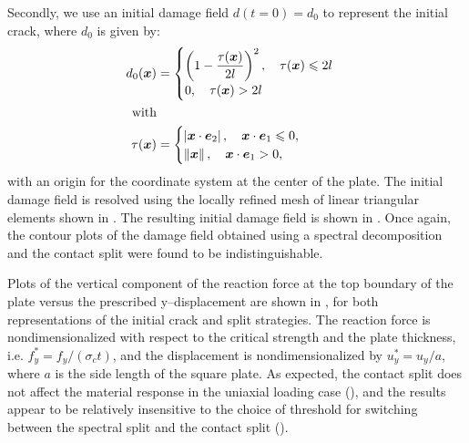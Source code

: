 

Secondly, we use an initial damage field $d(t = 0) = d_0$ to represent the initial crack, where $d_0$ is given by:
\begin{align}
  d_0(\boldsymbol{x})  & =
  \begin{cases}
    \left( 1-\dfrac{\tau(\boldsymbol{x})}{2l} \right)^2, \quad \tau(\boldsymbol{x}) \leqslant 2l \\
    0, \quad  \tau(\boldsymbol{x}) > 2l
  \end{cases} \label{eq: mode1 initial damage} \\
  \mbox{with}  &                                             \\
  \tau(\boldsymbol{x}) & =
  \begin{cases}
    \left\vert \boldsymbol{x}\cdot\boldsymbol{e}_2 \right\vert, \quad \boldsymbol{x}\cdot\boldsymbol{e}_1 \leqslant 0, \\
    \left\lVert\boldsymbol{x}\right\rVert, \quad \boldsymbol{x}\cdot\boldsymbol{e}_1 > 0,
  \end{cases}
\end{align}
with an origin for the coordinate system at the center of the plate. The initial damage field is resolved using the locally refined mesh of linear triangular elements shown in . The resulting initial damage field is shown in .  Once again, the contour plots of the damage field obtained using a spectral decomposition and the contact split were found to be indistinguishable.



Plots of the vertical component of the reaction force at the top boundary of the plate versus the prescribed y--displacement are shown in , for both representations of the initial crack and split strategies.  The reaction force is nondimensionalized with respect to the critical strength and the plate thickness, i.e. $f_y^* = f_y / (\sigma_c t)$, and the displacement is nondimensionalized by $u_y^* = u_y / a$, where $a$ is the side length of the square plate.  As expected, the contact split does not affect the material response in the uniaxial loading case (), and the results appear to be relatively insensitive to the choice of threshold for switching between the spectral split and the contact split ().



